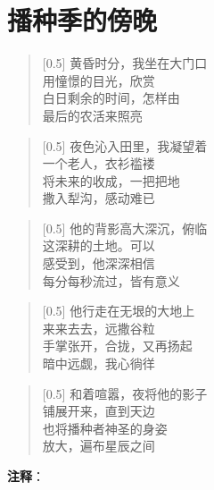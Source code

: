 \documentclass[12pt,UTF-8,openany]{ctexbook}
\begin{document}
\chapter{播种季的傍晚}

\begin{normalsize}
    
    \begin{verse}[0.5\linewidth]
        黄昏时分，我坐在大门口 \\
        用憧憬的目光，欣赏 \\
        白日剩余的时间，怎样由 \\
        最后的农活来照亮
    \end{verse}
    
    
    \begin{verse}[0.5\linewidth]
        夜色沁入田里，我凝望着 \\
        一个老人，衣衫褴褛 \\
        将未来的收成，一把把地 \\
        撒入犁沟，感动难已
    \end{verse}
    
    
    \begin{verse}[0.5\linewidth]
        他的背影高大深沉，俯临 \\
        这深耕的土地。可以 \\
        感受到，他深深相信 \\
        每分每秒流过，皆有意义
    \end{verse}
    
    
    \begin{verse}[0.5\linewidth]
        他行走在无垠的大地上 \\
        来来去去，远撒谷粒 \\
        手掌张开，合拢，又再扬起 \\
        暗中远觑，我心徜徉
    \end{verse}
    
    
    \begin{verse}[0.5\linewidth]
        和着喧嚣，夜将他的影子 \\
        铺展开来，直到天边 \\
        也将播种者神圣的身姿 \\
        放大，遍布星辰之间
    \end{verse}
    
\end{normalsize}


\newpage

\textbf{注释}：
\end{document}
